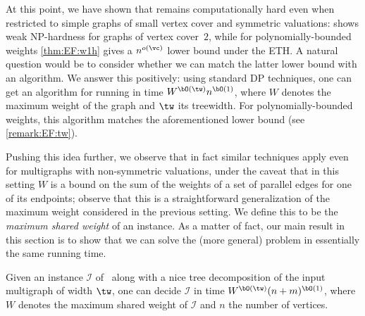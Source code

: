 \documentclass[11pt,letterpaper]{article}
\begin{document}
At this point, we have shown that {\EFo} remains computationally hard even when restricted to simple graphs of small vertex cover and symmetric valuations:
 shows weak NP-hardness for graphs of vertex cover~$2$,
while for polynomially-bounded weights \cref{thm:EF:w1h} gives a $n^{o(\vc)}$ lower bound under the ETH.
A natural question would be to consider whether we can match the latter lower bound with an algorithm.
We answer this positively: using standard DP techniques, one can get an algorithm for {\EFo} running in time $W^{\bO(\tw)} n^{\bO(1)}$,
where $W$ denotes the maximum weight of the graph and $\tw$ its treewidth.
For polynomially-bounded weights, this algorithm matches the aforementioned lower bound (see \cref{remark:EF:tw}).

Pushing this idea further, we observe that in fact similar techniques apply even for multigraphs with non-symmetric valuations,
under the caveat that in this setting $W$ is a bound on the
sum of the weights of a set of parallel edges for one of its endpoints; observe that this is a straightforward generalization of the maximum weight considered in the previous setting.
We define this to be the \emph{maximum shared weight} of an instance.
As a matter of fact, our main result in this section is to show that we can solve the (more general) {\EFmc} problem in essentially the same running time.


\begin{theoremrep}[\appsymb]\label{thm:ef:fpt_tw}
    Given an instance $\mathcal{I}$ of \EFmc\ along with a nice tree decomposition of the input multigraph of width $\tw$,
    one can decide $\mathcal{I}$ in time $W^{\bO(\tw)} (n+m)^{\bO(1)}$,
    where $W$ denotes the maximum shared weight of $\mathcal{I}$ and $n$ the number of vertices.
\end{theoremrep}
\end{document}
